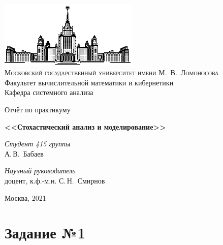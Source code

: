 \documentclass[11pt]{article}
\begin{document}
	\newtheorem{theorem}{Теорема}
	\newtheorem{opr}{Определение}
	\newtheorem{utv}{Утверждение}
	\thispagestyle{empty}
	
	\begin{center}
		\ \vspace{-3cm}
		
		\includegraphics[width=0.5\textwidth]{msu.eps}\\
		{\scshape Московский государственный университет имени М.~В.~Ломоносова}\\
		Факультет вычислительной математики и кибернетики\\
		Кафедра системного анализа
		
		\vfill
		
		{\LARGE Отчёт по практикуму}
		
		\vspace{1cm}
		
		{\Huge\bfseries <<Стохастический анализ и моделирование>>}
	\end{center}
	
	\vspace{1cm}
	
	\begin{flushright}
		\large
		\textit{Студент 415 группы}\\
		А.\,В.~Бабаев
		
		\vspace{5mm}
		
		\textit{Научный руководитель}\\
		 доцент, к.ф.-м.н. С.\,Н.~Смирнов
	\end{flushright}
	
	\vfill
	
	\begin{center}
		Москва, 2021
	\end{center}
	
	\newpage
	\tableofcontents
	\newpage
	\section{Задание №1}
\end{document}
